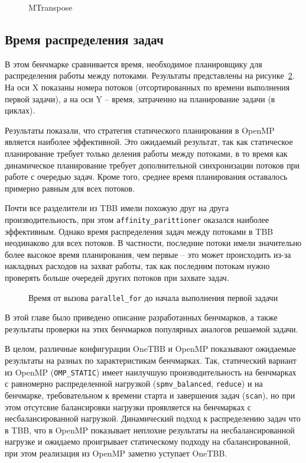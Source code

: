 \documentclass[times,specification,annotation]{itmo-student-thesis}
\begin{document}
\begin{figure}[!htb]
    \centering
        
    \caption{MTranspose}\label{Fig:Mtranspose}
\end{figure}
    
\subsection{Время распределения задач}
В этом бенчмарке сравнивается время, необходимое планировщику для распределения работы между потоками.
Результаты представлены на рисунке~\ref{Fig:SchedulingTime}.
На оси X показаны номера потоков (отсортированных по времени выполнения первой задачи), а на оси Y -- время, затраченно на планирование задачи (в циклах).

Результаты показали, что стратегия статического планирования в OpenMP является наиболее эффективной. Это ожидаемый результат, так как статическое планирование требует только деления работы между потоками, в то время как динамическое планирование требует дополнительной синхронизации потоков при работе с очередью задач. Кроме того, среднее время планирования оставалось примерно равным для всех потоков.

Почти все разделители из TBB имели похожую друг на друга производительность, при этом \texttt{affinity\_parittioner} оказался наиболее эффективным. Однако время распределения задач между потоками в TBB неодинаково для всех потоков. В частности, последние потоки имели значительно более высокое время планирования, чем первые -- это может происходить из-за накладных расходов на захват работы, так как последним потокам нужно проверять больше очередей других потоков при захвате задач.

\begin{figure}[t!]
\centering

\caption{Время от вызова \texttt{parallel\_for} до начала выполнения первой задачи}\label{Fig:SchedulingTime}
\end{figure}

\chapterconclusion
В этой главе было приведено описание разработанных бенчмарков, а также результаты проверки на этих бенчмарков популярных аналогов решаемой задачи. 

В целом, различные конфигурации OneTBB и OpenMP показывают ожидаемые результаты на разных по характеристикам бенчмарках. Так, статический вариант из OpenMP (\texttt{OMP\_STATIC}) имеет наилучшую производительность на бенчмарках с равномерно распределенной нагрузкой (\texttt{spmv\_balanced}, \texttt{reduce}) и на бенчмарке, требовательном к времени старта и завершения задач (\texttt{scan}), но при этом отсутсвие балансировки нагрузки проявляется на бенчмарках с несбалансированной нагрузкой. Динамический подход к распределению задач что в TBB, что в OpenMP показывает неплохие результаты на несбалансированной нагрузке и ожидаемо проигрывает статическому подходу на сбалансированной, при этом реализация из OpenMP заметно уступает OneTBB.
\end{document}
